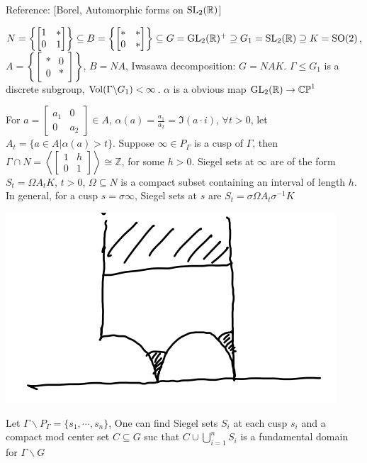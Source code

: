\documentclass[../main.tex]{subfiles}
\begin{document}
Reference: [Borel, Automorphic forms on $\operatorname{SL}_2(\mathbb R)$]

$N=\left\{\begin{bmatrix}
1&*\\
0&1
\end{bmatrix}\right\}\subseteq B=\left\{\begin{bmatrix}
*&*\\
0&*
\end{bmatrix}\right\} \subseteq G=\operatorname{GL}_2(\mathbb R)^+\supseteq G_1=\operatorname{SL}_2(\mathbb R)\supseteq K=\operatorname{SO}(2)$, $A=\left\{\begin{bmatrix}
*&0\\
0&*
\end{bmatrix}\right\}$, $B=NA$, Iwasawa decomposition: $G=NAK$. $\Gamma\leq G_1$ is a discrete subgroup, $\operatorname{Vol}(\Gamma\backslash G_1)<\infty$. $\alpha$ is a obvious map $\operatorname{GL}_2(\mathbb R)\to\mathbb{CP}^1$

\begin{definition}
For $a=\begin{bmatrix}
a_1&0\\
0&a_2
\end{bmatrix}\in A$, $\alpha(a)=\frac{a_1}{a_2}=\Im(a\cdot i)$, $\forall t>0$, let $A_t=\{a\in A|\alpha(a)>t\}$. Suppose $\infty\in P_\Gamma$ is a cusp of $\Gamma$, then $\Gamma\cap N=\left\langle\begin{bmatrix}
1&h\\
0&1
\end{bmatrix}\right\rangle\cong\mathbb Z$, for some $h>0$. Siegel sets at $\infty$ are of the form $S_t=\Omega A_tK$, $t>0$, $\Omega\subseteq N$ is a compact subset containing an interval of length $h$. In general, for a cusp $s=\sigma\infty$, Siegel sets at $s$ are $S_t=\sigma\Omega A_t\sigma^{-1}K$
\begin{center}
\includegraphics[scale=0.3]{Pictures/Siegel_set.png}
\end{center}
Let $\Gamma\backslash P_\Gamma=\{s_1,\cdots,s_n\}$, One can find Siegel sets $S_i$ at each cusp $s_i$ and a compact mod center set $C\subseteq G$ suc that $C\cup\bigcup_{i=1}^nS_i$ is a fundamental domain for $\Gamma\backslash G$
\end{definition}
\end{document}
